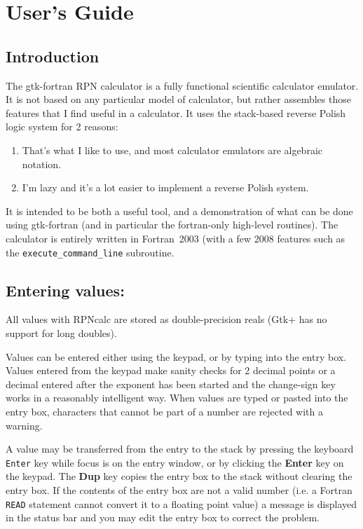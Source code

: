 \documentclass{article}
\begin{document}
  \section{User's Guide}

  \subsection{Introduction}

  The gtk-fortran RPN calculator is a fully functional scientific
  calculator emulator. It is not based on any particular model of
  calculator, but rather assembles those features that I find useful in
  a calculator. It uses the stack-based reverse Polish logic system for
  2 reasons:
  \begin{enumerate}
  \item That's what I like to use, and most calculator emulators are
    algebraic notation.
  \item I'm lazy and it's a lot easier to implement a reverse Polish
    system.
  \end{enumerate}

  It is intended to be both a useful tool, and a demonstration of what
  can be done using gtk-fortran (and in particular the fortran-only
  high-level routines). The calculator is entirely written in
  Fortran~2003 (with a few 2008 features such as the
  \texttt{execute\_command\_line} subroutine.

  \subsection{Entering values:}

  All values with RPNcalc are stored as double-precision reals (Gtk+
  has no support for long doubles).

  Values can be entered either using the keypad, or by typing into the
  entry box. Values entered from the keypad make sanity checks for 2
  decimal points or a decimal entered after the exponent has been
  started and the change-sign key works in a reasonably intelligent
  way. When values are typed or pasted into the entry box, characters
  that cannot be part of a number are rejected with a warning.

  A value may be transferred from the entry to the stack by pressing
  the keyboard \texttt{Enter} key while focus is on the entry window,
  or by clicking the \textbf{Enter} key on the keypad. The \textbf{Dup}
  key copies the entry box to the stack without clearing the entry
  box. If the contents of the entry box are not a valid number (i.e. a
  Fortran \texttt{READ} statement cannot convert it to a floating point
  value) a message is displayed in the status bar and you may edit the
  entry box to correct the problem.
\end{document}
